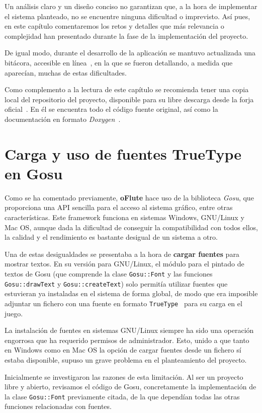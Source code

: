 Un análisis claro y un diseño conciso no garantizan que, a la hora de
implementar el sistema planteado, no se encuentre ninguna dificultad o
imprevisto. Así pues, en este capítulo comentaremos los retos y detalles que más
relevancia o complejidad han presentado durante la fase de la implementación del
proyecto.

De igual modo, durante el desarrollo de la aplicación se mantuvo actualizada una
bitácora, accesible en línea~\cite{ofluteblog}, en la que se fueron detallando,
a medida que aparecían, muchas de estas dificultades.

Como complemento a la lectura de este capítulo se recomienda tener una copia
local del repositorio del proyecto, disponible para su libre descarga desde la
forja oficial~\cite{ofluteforja}. En él se encuentra todo el código fuente
original, así como la documentación en formato \textit{Doxygen}~\cite{doxygen}.

\section{Carga y uso de fuentes TrueType en Gosu}

Como se ha comentado previamente, \textbf{oFlute} hace uso de la biblioteca
\textit{Gosu}, que proporciona una API sencilla para el acceso al sistema
gráfico, entre otras características. Este framework funciona en sistemas
Windows, GNU/Linux y Mac OS, aunque dada la dificultad de conseguir la
compatibilidad con todos ellos, la calidad y el rendimiento es bastante
desigual de un sistema a otro.

Una de estas desigualdades se presentaba a la hora de \textbf{cargar fuentes}
para mostrar textos. En su versión para GNU/Linux, el módulo para el pintado de
textos de Gosu (que comprende la clase \texttt{Gosu::Font} y las funciones
\texttt{Gosu::drawText} y \texttt{Gosu::createText}) solo permitía
utilizar fuentes que estuvieran ya instaladas en el sistema de forma global, de
modo que era imposible adjuntar un fichero con una fuente en formato
\texttt{TrueType}~\cite{reftruetype} para su carga en el juego. 

La instalación de fuentes en sistemas GNU/Linux siempre ha sido una operación
engorrosa que ha requerido permisos de administrador. Esto, unido a que tanto en
Windows como en Mac OS la opción de cargar fuentes desde un fichero sí estaba
disponible, supuso un grave problema en el planteamiento del proyecto.

Inicialmente se investigaron las razones de esta limitación. Al ser un proyecto
libre y abierto, revisamos el código de Gosu, concretamente la implementación
de la clase \texttt{Gosu::Font} previamente citada, de la que dependían todas
las otras funciones relacionadas con fuentes.

